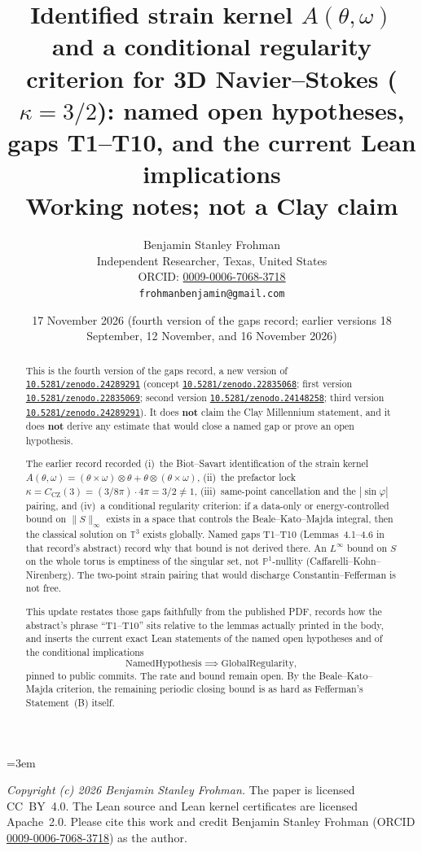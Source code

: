 \documentclass[11pt]{article}
\title{Identified strain kernel \(A(\theta,\omega)\) and a conditional regularity criterion for 3D Navier--Stokes (\(\kappa=3/2\)): named open hypotheses, gaps T1--T10, and the current Lean implications\\
\large Working notes; not a Clay claim}
\author{Benjamin Stanley Frohman\\
Independent Researcher, Texas, United States\\
ORCID: \href{https://orcid.org/0009-0006-7068-3718}{0009-0006-7068-3718}\\
\texttt{frohmanbenjamin@gmail.com}}
\date{17 November 2026 (fourth version of the gaps record; earlier versions 18 September, 12 November, and 16 November 2026)}
\theoremstyle{plain}
\theoremstyle{definition}
\theoremstyle{remark}
\newcommand{\Tthree}{\mathbb{T}^{3}}
\newcommand{\doi}[1]{\href{https://doi.org/#1}{\texttt{#1}}}
\begin{document}
\emergencystretch=3em
\maketitle
\noindent\textit{Copyright (c) 2026 Benjamin Stanley Frohman.} The paper is licensed CC~BY~4.0. The Lean source and Lean kernel certificates are licensed Apache~2.0. Please cite this work and credit Benjamin Stanley Frohman (ORCID \href{https://orcid.org/0009-0006-7068-3718}{0009-0006-7068-3718}) as the author.


\begin{abstract}
This is the fourth version of the gaps record, a new version of \doi{10.5281/zenodo.24289291} (concept \doi{10.5281/zenodo.22835068}; first version \doi{10.5281/zenodo.22835069}; second version \doi{10.5281/zenodo.24148258}; third version \doi{10.5281/zenodo.24289291}). It does \textbf{not} claim the Clay Millennium statement, and it does \textbf{not} derive any estimate that would close a named gap or prove an open hypothesis.

The earlier record recorded (i)~the Biot--Savart identification of the strain kernel \(A(\theta,\omega)=(\theta\times\omega)\otimes\theta+\theta\otimes(\theta\times\omega)\), (ii)~the prefactor lock \(\kappa=C_{\mathrm{CZ}}(3)=(3/8\pi)\cdot 4\pi=3/2\neq 1\), (iii)~same-point cancellation and the \(|\sin\varphi|\) pairing, and (iv)~a conditional regularity criterion: if a data-only or energy-controlled bound on \(\|S\|_{\infty}\) exists in a space that controls the Beale--Kato--Majda integral, then the classical solution on \(\Tthree\) exists globally. Named gaps T1--T10 (Lemmas~4.1--4.6 in that record's abstract) record why that bound is not derived there. An \(L^{\infty}\) bound on \(S\) on the whole torus is emptiness of the singular set, not \(\mathbb{P}^{1}\)-nullity (Caffarelli--Kohn--Nirenberg). The two-point strain pairing that would discharge Constantin--Fefferman is not free.

This update restates those gaps faithfully from the published PDF, records how the abstract's phrase ``T1--T10'' sits relative to the lemmas actually printed in the body, and inserts the current exact Lean statements of the named open hypotheses and of the conditional implications
\[
\text{NamedHypothesis}\implies\text{GlobalRegularity},
\]
pinned to public commits. The rate and bound remain open. By the Beale--Kato--Majda criterion, the remaining periodic closing bound is as hard as Fefferman's Statement~(B) itself.


\end{abstract}
\end{document}
